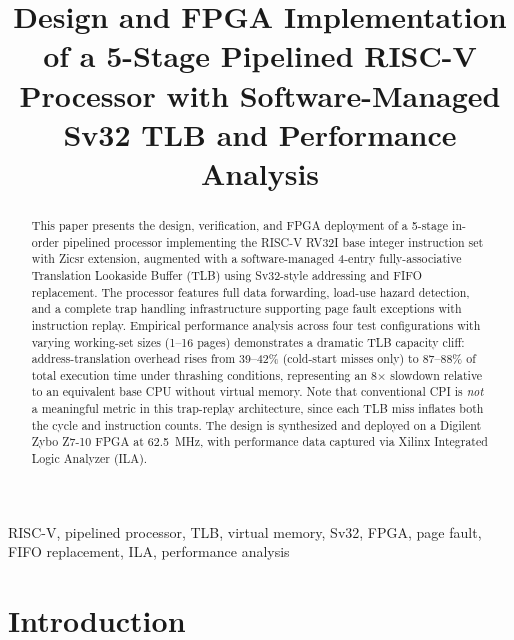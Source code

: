 \documentclass[conference]{IEEEtran}
\begin{document}
\title{Design and FPGA Implementation of a 5-Stage Pipelined RISC-V Processor with Software-Managed Sv32 TLB and Performance Analysis}

\author{
}

\maketitle

\begin{abstract}
This paper presents the design, verification, and FPGA deployment of a 5-stage in-order pipelined processor implementing the RISC-V RV32I base integer instruction set with Zicsr extension, augmented with a software-managed 4-entry fully-associative Translation Lookaside Buffer (TLB) using Sv32-style addressing and FIFO replacement. The processor features full data forwarding, load-use hazard detection, and a complete trap handling infrastructure supporting page fault exceptions with instruction replay. Empirical performance analysis across four test configurations with varying working-set sizes (1--16 pages) demonstrates a dramatic TLB capacity cliff: address-translation overhead rises from 39--42\% (cold-start misses only) to 87--88\% of total execution time under thrashing conditions, representing an 8$\times$ slowdown relative to an equivalent base CPU without virtual memory. Note that conventional CPI is \textit{not} a meaningful metric in this trap-replay architecture, since each TLB miss inflates both the cycle and instruction counts. The design is synthesized and deployed on a Digilent Zybo Z7-10 FPGA at 62.5~MHz, with performance data captured via Xilinx Integrated Logic Analyzer (ILA).
\end{abstract}

\begin{IEEEkeywords}
RISC-V, pipelined processor, TLB, virtual memory, Sv32, FPGA, page fault, FIFO replacement, ILA, performance analysis
\end{IEEEkeywords}

\section{Introduction}
\end{document}
